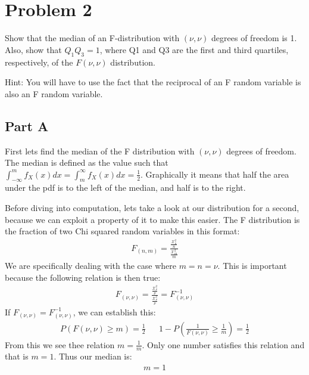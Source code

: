 \documentclass{article}
\begin{document}
\section*{Problem 2}
Show that the median of an F-distribution with $(\nu, \nu)$ degrees of freedom is 1. Also,
show that $Q_1Q_3 = 1$, where Q1 and Q3 are the first and third quartiles, respectively, of the $F(\nu,\nu)$
distribution.

Hint: You will have to use the fact that the reciprocal of an F random variable is also an F random
variable.

\subsection*{Part A}
First lets find the median of the F distribution with $(\nu, \nu)$ degrees of freedom. The median is defined as the value such that $\int_{-\infty}^{m} f_X(x) dx = \int_{m}^{\infty} f_X(x) dx = \frac{1}{2}$. Graphically it means that half the area under the pdf is to the left of the median, and half is to the right.

Before diving into computation, lets take a look at our distribution for a second, because we can exploit a property of it to make this easier. The F distribution is the fraction of two Chi squared random variables in this format:
\begin{align*}
F_{(n,m)} = \frac{\tfrac{\mathcal{X}_n^2}{n}}{\tfrac{\mathcal{X}_m^2}{m}}
\end{align*}
We are specifically dealing with the case where $m=n=\nu$. This is important because the following relation is then true:
\begin{align*}
F_{(\nu,\nu)} = \frac{\tfrac{\mathcal{X}_\nu^2}{\nu}}{\tfrac{\mathcal{X}^2_\nu}{\nu}} = F_{(\nu,\nu)}^{-1}
\end{align*}
If $F_{(\nu,\nu)}=F_{(\nu,\nu)}^{-1}$, we can establish this:
\begin{align*}
P(F(\nu,\nu)\geq m) = \frac{1}{2} && 1 - P(\frac{1}{F(\nu,\nu)} \geq \frac{1}{m}) = \frac{1}{2}
\end{align*}
From this we see thee relation $m=\tfrac{1}{m}$. Only one number satisfies this relation and that is $m=1$. Thus our median is:
\begin{align*}
\boxed{m=1}
\end{align*}
\end{document}
